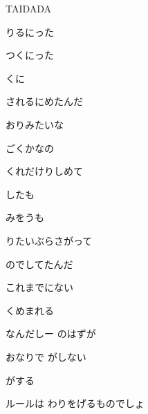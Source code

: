\documentclass[a4paper,tate,twocolumn,12pt]{ltjtarticle}
\begin{document}
\thispagestyle{empty}

\begin{center}
{\LARGE TAIDADA}
\end{center}

\vspace{1em}

\begin{flushleft}

\noindent\begin{minipage}{\linewidth}
りるにった

つくにった

くに

されるにめたんだ

おりみたいな

ごくかなの

くれだけりしめて
\end{minipage}

\vspace{2em}

\noindent\begin{minipage}{\linewidth}
したも

みをうも

りたいぶらさがって

のでしてたんだ

これまでにない

くめまれる
\end{minipage}

\vspace{2em}

\noindent\begin{minipage}{\linewidth}
なんだしー のはずが

おなりで がしない

 がする

ルールは わりをげるものでしょ
\end{minipage}


\end{flushleft}
\end{document}
